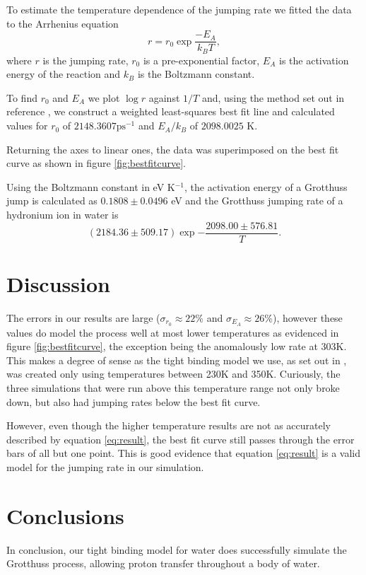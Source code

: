 \documentclass[reprint,]{revtex4-2}
\begin{document}
To estimate the temperature dependence of the jumping rate we fitted the data to the Arrhenius equation \cite{arrhenius1889dissociationswarme}
\begin{equation}
	\label{eq:arrhenius}
	r = r_{0}\exp{\frac{-E_{A}}{k_{B}T}},
\end{equation}
where $r$ is the jumping rate, $r_0$ is a pre-exponential factor, $E_{A}$ is the activation energy of the reaction and $k_{B}$ is the Boltzmann constant.\cite{planck1900theory}

To find $r_{0}$ and $E_{A}$ we plot $\log r$ against $1/T$ and, using the method set out in reference \cite{gatland1993weight}, we construct a weighted least-squares best fit line and calculated values for $r_{0}$ of $2148.3607\text{ps}^{-1}$ and ${E_{A}}/{k_{B}}$ of $2098.0025$ K.

Returning the axes to linear ones, the data was superimposed on the best fit curve as shown in figure \ref{fig:bestfitcurve}.

Using the Boltzmann constant in eV K$^{-1}$, the activation energy of a Grotthuss jump is calculated as $0.1808\pm 0.0496$ eV and the Grotthuss jumping rate of a hydronium ion in water is 
\begin{equation}
\label{eq:result}
	(2184.36 \pm 509.17)\exp{-\frac{2098.00 \pm 576.81}{T}}.
\end{equation}

\section{Discussion}
The errors in our results are large ($\sigma_{r_{0}}\approx 22\%$ and $\sigma_{E_{A}}\approx 26\%$), however these values do model the process well at most lower temperatures as evidenced in figure \ref{fig:bestfitcurve}, the exception being the anomalously low rate at 303K. This makes a degree of sense as the tight binding model we use, as set out in \cite{Lozovoi2014}, was created only using temperatures between 230K and 350K. Curiously, the three simulations that were run above this temperature range not only broke down, but also had jumping rates below the best fit curve.

However, even though the higher temperature results are not as accurately described by equation \ref{eq:result}, the best fit curve still passes through the error bars of all but one point. This is good evidence that equation \ref{eq:result} is a valid model for the jumping rate in our simulation.
\section{Conclusions}
In conclusion, our tight binding model for water does successfully simulate the Grotthuss process, allowing proton transfer throughout a body of water. 
\end{document}
